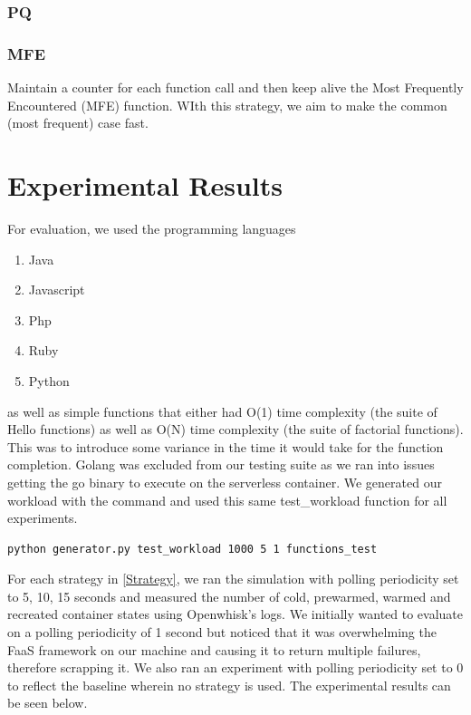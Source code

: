 \documentclass{article}
\begin{document}
\subsubsection{PQ}


\subsubsection{MFE}

Maintain a counter for each function call and then keep alive the Most Frequently Encountered (MFE) function. WIth this strategy, we aim to make the common (most frequent) case fast.

\section{Experimental Results}

For evaluation, we used the programming languages

\begin{enumerate}
    \item Java
    \item Javascript
    \item Php
    \item Ruby
    \item Python
\end{enumerate}

as well as simple functions that either had O(1) time complexity (the suite of Hello functions) as well as O(N) time complexity (the suite of factorial functions). This was to introduce some variance in the time it would take for the function completion. Golang was excluded from our testing suite as we ran into issues getting the go binary to execute on the serverless container. We generated our workload with the command and used this same test\_workload function for all experiments.

\begin{lstlisting}[language=bash,caption={Generating the workload}]
python generator.py test_workload 1000 5 1 functions_test 
\end{lstlisting}

For each strategy in \ref{Strategy}, we ran the simulation with polling periodicity set to 5, 10, 15 seconds and measured the number of cold, prewarmed, warmed and recreated container states using Openwhisk's logs. We initially wanted to evaluate on a polling periodicity of 1 second but noticed that it was overwhelming the FaaS framework on our machine and causing it to return multiple failures, therefore scrapping it. We also ran an experiment with polling periodicity set to 0 to reflect the baseline wherein no strategy is used. The experimental results can be seen below.
\end{document}
